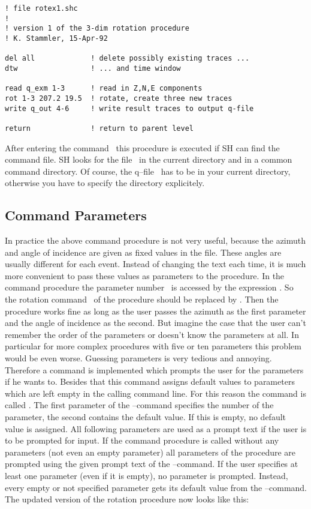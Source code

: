 \begin{verbatim}
! file rotex1.shc
!
! version 1 of the 3-dim rotation procedure
! K. Stammler, 15-Apr-92

del all             ! delete possibly existing traces ...
dtw                 ! ... and time window

read q_exm 1-3      ! read in Z,N,E components
rot 1-3 207.2 19.5  ! rotate, create three new traces
write q_out 4-6     ! write result traces to output q-file

return              ! return to parent level
\end{verbatim}

After entering the command \ this procedure is executed
if SH can find the command file.  SH looks for the file
\ in the current directory and in a common
command directory.  Of course, the q--file \ has to
be in your current directory, otherwise you have to specify the
directory explicitely.

\subsection{Command Parameters}

In practice the above command procedure is not very useful,
because the azimuth and angle of incidence are given as fixed
values in the file.  These angles are usually different for
each event.  Instead of changing the text each time, it is
much more convenient to pass these values as parameters to
the procedure.  In the command procedure the parameter number
\ is accessed by the expression .  So the rotation
command \ of the procedure should be
replaced by .  Then the procedure works fine as
long as the user passes the azimuth as the first parameter and
the angle of incidence as the second.  But imagine the case that
the user can't remember the order of the parameters or doesn't
know the parameters at all.  In particular for more complex
procedures with five or ten parameters this problem would be even
worse.  Guessing parameters is very tedious and annoying.
Therefore a command is implemented which prompts the user for
the parameters if he wants to.  Besides that this command
assigns default values to parameters which are left empty in
the calling command line.  For this reason the command is called
.  The first parameter of the --command
specifies the number of the parameter, the second contains the
default value.  If this is empty, no default value is assigned.
All following parameters are used as a prompt text if the user
is to be prompted for input.  If the command procedure is called
without any parameters (not even an empty parameter) all parameters
of the procedure are prompted using the given prompt text of the
--command.  If the user specifies at least one parameter
(even if it is empty), no parameter is prompted.  Instead, every
empty or not specified parameter gets its default value from
the --command.  The updated version of the rotation
procedure now looks like this:

